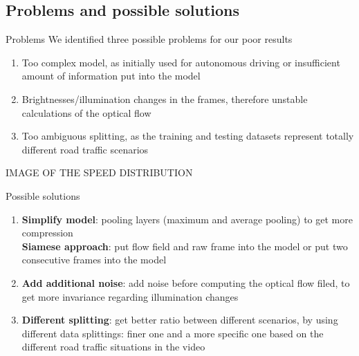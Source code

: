 \subsection{Problems and possible solutions}
\begin{frame}{Problems}
We identified three possible problems for our poor results
\begin{enumerate}
\item Too complex model, as initially used for autonomous driving or insufficient amount of information put into the model
\item Brightnesses/illumination changes in the frames, therefore unstable calculations of the optical flow
\item Too ambiguous splitting, as the training and testing datasets represent totally different road traffic scenarios
\end{enumerate}
IMAGE OF THE SPEED DISTRIBUTION
\end{frame}
\begin{frame}{Possible solutions}

\begin{enumerate}
\item \textbf{Simplify model}: pooling layers (maximum and average pooling) to get more compression\\
\textbf{Siamese approach}: put flow field and raw frame into the model or put two consecutive frames into the model
\item \textbf{Add additional noise}: add noise before computing the optical flow filed, to get more invariance regarding illumination changes
\item \textbf{Different splitting}: get better ratio between different scenarios, by using different data splittings:
finer one and a more specific one based on the different road traffic situations in the video
\end{enumerate}
\end{frame}
